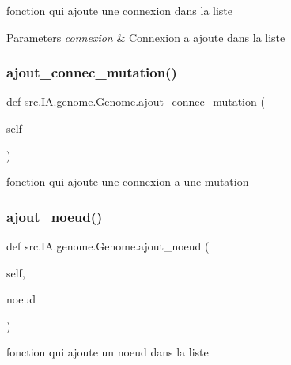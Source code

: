 fonction qui ajoute une connexion dans la liste 


\begin{DoxyParams}{Parameters}
{\em connexion} & Connexion a ajoute dans la liste \\
\hline
\end{DoxyParams}
\mbox{\label{classsrc_1_1_i_a_1_1genome_1_1_genome_a6f7059702835cf2c68493e9b55216c74}} 
\subsubsection{\texorpdfstring{ajout\+\_\+connec\+\_\+mutation()}{ajout\_connec\_mutation()}}
{\footnotesize\ttfamily def src.\+I\+A.\+genome.\+Genome.\+ajout\+\_\+connec\+\_\+mutation (\begin{DoxyParamCaption}\item[{}]{self }\end{DoxyParamCaption})}



fonction qui ajoute une connexion a une mutation 

\mbox{\label{classsrc_1_1_i_a_1_1genome_1_1_genome_a8af471d98e92b89554c1d8c529cbd9b6}} 
\subsubsection{\texorpdfstring{ajout\+\_\+noeud()}{ajout\_noeud()}}
{\footnotesize\ttfamily def src.\+I\+A.\+genome.\+Genome.\+ajout\+\_\+noeud (\begin{DoxyParamCaption}\item[{}]{self,  }\item[{}]{noeud }\end{DoxyParamCaption})}



fonction qui ajoute un noeud dans la liste 


